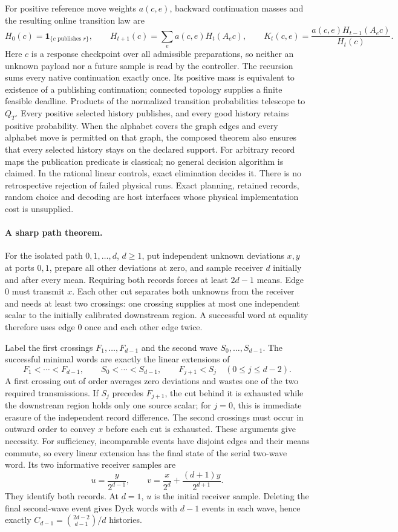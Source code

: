 For positive reference move weights $a(c,e)$, backward continuation masses
and the resulting online transition law are
\[
 H_0(c)=\mathbf1_{\{c\text{ publishes }r\}},\qquad
 H_{t+1}(c)=\sum_e a(c,e)H_t(A_ec),\qquad
 K_t(c,e)=\frac{a(c,e)H_{t-1}(A_ec)}{H_t(c)}.
\]
Here $c$ is a response checkpoint over all admissible preparations, so
neither an unknown payload nor a future sample is read by the controller.
The recursion sums every native continuation exactly once. Its positive
mass is equivalent to existence of a publishing continuation; connected
topology supplies a finite feasible deadline. Products of the normalized
transition probabilities telescope to $Q_T$. Every positive selected
history publishes, and every good history retains positive probability.
When the alphabet covers the graph edges and every alphabet move is
permitted on that graph, the composed theorem also ensures that every
selected history stays on the declared support. For arbitrary record maps
the publication predicate is classical; no general decision algorithm is
claimed. In the rational linear controls, exact elimination decides it.
There is no retrospective rejection of failed physical runs. Exact
planning, retained records, random choice and decoding are host
interfaces whose physical implementation cost is unsupplied.

\paragraph{A sharp path theorem.}
For the isolated path $0,1,\ldots,d$, $d\geq1$, put independent unknown
deviations $x,y$ at ports $0,1$, prepare all other deviations at zero, and
sample receiver $d$ initially and after every mean. Requiring both records
forces at least $2d-1$ means. Edge $0$ must transmit $x$. Each other cut
separates both unknowns from the receiver and needs at least two crossings:
one crossing supplies at most one independent scalar to the initially
calibrated downstream region. A successful word at equality therefore uses
edge $0$ once and each other edge twice.

Label the first crossings $F_1,\ldots,F_{d-1}$ and the second wave
$S_0,\ldots,S_{d-1}$. The successful minimal words are exactly the linear
extensions of
\[
 F_1<\cdots<F_{d-1},\qquad S_0<\cdots<S_{d-1},
 \qquad F_{j+1}<S_j\quad(0\leq j\leq d-2).
\]
A first crossing out of order averages zero deviations and wastes one of
the two required transmissions. If $S_j$ precedes $F_{j+1}$, the cut behind
it is exhausted while the downstream region holds only one source scalar;
for $j=0$, this is immediate erasure of the independent record difference.
The second crossings must occur in outward order to convey $x$ before each
cut is exhausted. These arguments give necessity. For sufficiency,
incomparable events have disjoint edges and their means commute, so every
linear extension has the final state of the serial two-wave word. Its two
informative receiver samples are
\[
 u=\frac{y}{2^{d-1}},\qquad
 v=\frac{x}{2^d}+\frac{(d+1)y}{2^{d+1}}.
\]
They identify both records. At $d=1$, $u$ is the initial receiver sample.
Deleting the final second-wave event gives Dyck words with $d-1$ events in
each wave, hence exactly $C_{d-1}=\binom{2d-2}{d-1}/d$ histories.


